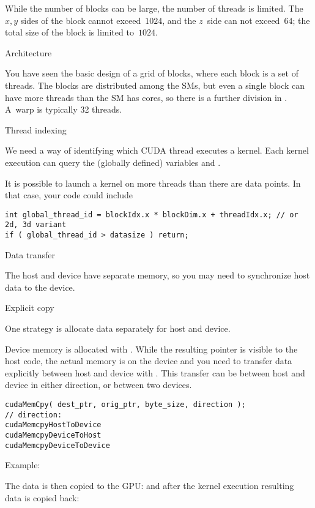 While the number of blocks can be large, the number of threads is limited.
The $x,y$ sides of the block cannot exceed~$1024$, and the $z$~side
can not exceed~$64$; the total size of the block is limited to~$1024$.

 {Architecture}

You have seen the basic design of a grid of blocks,
where each block is a set of threads.
The blocks are distributed among the \acp{SM},
but even a single block can have more threads than
the \ac{SM} has cores, so
there is a further division in .
A~warp is typically 32 threads.

 {Thread indexing}

We need a way of identifying which CUDA thread executes a kernel.
Each kernel execution can query the (globally defined) variables
 and .

It is possible to launch a kernel on more threads than
there are data points. In that case, your code could include
\begin{lstlisting}
int global_thread_id = blockIdx.x * blockDim.x + threadIdx.x; // or 2d, 3d variant
if ( global_thread_id > datasize ) return;
\end{lstlisting}

 {Data transfer}

The host and device have separate memory, so you may need to
synchronize host data to the device.

 {Explicit copy}

One strategy is allocate data separately for host and device.

Device memory is allocated with .
While the resulting pointer is visible to the host code,
the actual memory is on the device and you need to transfer data explicitly
between host and device with .
This transfer can be between host and device in either direction,
or between two devices.

\begin{lstlisting}
cudaMemCpy( dest_ptr, orig_ptr, byte_size, direction );
// direction:
cudaMemcpyHostToDevice
cudaMemcpyDeviceToHost
cudaMemcpyDeviceToDevice
\end{lstlisting}

Example:

The data is then copied to the \ac{GPU}:
and after the kernel execution resulting data is copied back:

